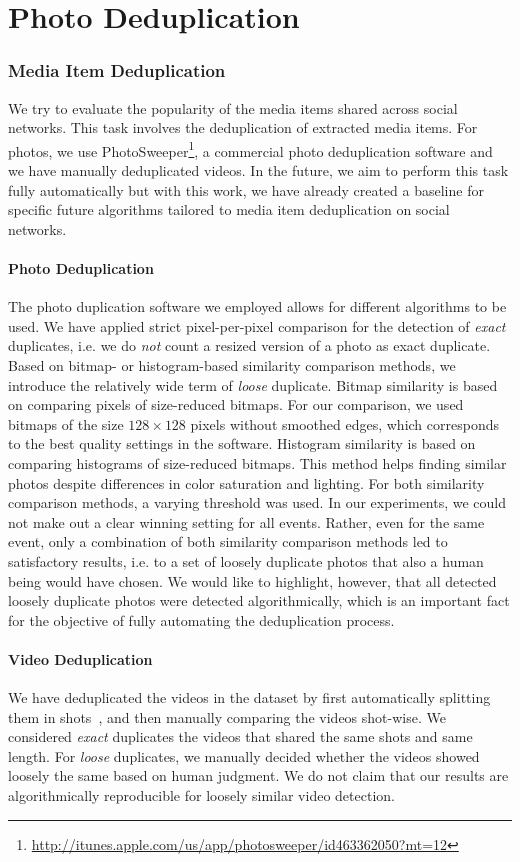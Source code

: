 \section{Photo Deduplication}
\subsubsection{Media Item Deduplication}
We try to evaluate the popularity of the media items shared across social networks. This task involves the deduplication of extracted media items.
For photos, we use PhotoSweeper\footnote{\url{http://itunes.apple.com/us/app/photosweeper/id463362050?mt=12}}, a commercial photo deduplication software and we have manually deduplicated videos. In the future, we aim to perform this task fully automatically but with this work, we have already created a baseline for specific future algorithms tailored to media item deduplication on social networks.

\paragraph{Photo Deduplication}
The photo duplication software we employed allows for different algorithms to be used. We have applied strict pixel-per-pixel comparison for the detection of \emph{exact} duplicates, i.e. we do \emph{not} count a resized version of a photo as exact duplicate. Based on bitmap- or histogram-based similarity comparison methods, we introduce the relatively wide term of \emph{loose} duplicate. Bitmap similarity is based on comparing pixels of size-reduced bitmaps.
For our comparison, we used bitmaps of the size $128 \times 128$ pixels without smoothed edges, which corresponds to the best quality settings in the software.
Histogram similarity is based on comparing histograms of size-reduced bitmaps. This method helps finding similar photos despite differences in color saturation and lighting. For both similarity comparison methods, a varying threshold was used. In our experiments, we could not make out a clear winning setting for all events. Rather, even for the same event, only a combination of both similarity comparison methods led to satisfactory results, i.e. to a set of loosely duplicate photos that also a human being would have chosen. We would like to highlight, however, that all detected loosely duplicate photos were detected algorithmically, which is an important fact for the objective of fully automating the deduplication process.

\paragraph{Video Deduplication}
We have deduplicated the videos in the dataset by first automatically splitting them in shots~\cite{CrowdsourcingEvent}, and then manually comparing the videos shot-wise. We considered \emph{exact} duplicates the videos that shared the same shots and same length. For \emph{loose} duplicates, we manually decided whether the videos showed loosely the same based on human judgment. We do not claim that our results are algorithmically reproducible for loosely similar video detection.

